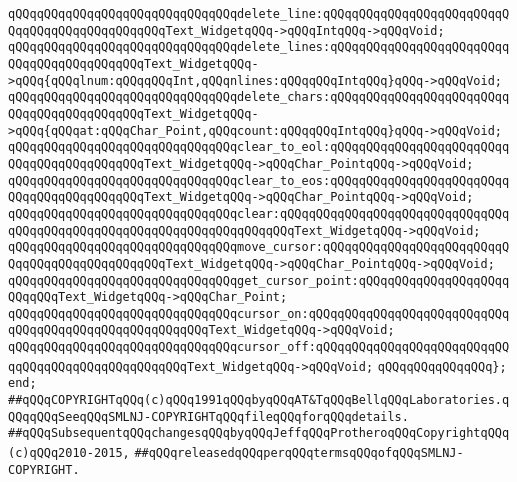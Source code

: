 \verb|qQQqqQQqqQQqqQQqqQQqqQQqqQQqqQQqdelete_line:qQQqqQQqqQQqqQQqqQQqqQQqqQQqqQQqqQQqqQQqqQQqqQQqText_WidgetqQQq->qQQqIntqQQq->qQQqVoid;|\newline
\verb|qQQqqQQqqQQqqQQqqQQqqQQqqQQqqQQqdelete_lines:qQQqqQQqqQQqqQQqqQQqqQQqqQQqqQQqqQQqqQQqqQQqText_WidgetqQQq->qQQq{qQQqlnum:qQQqqQQqInt,qQQqnlines:qQQqqQQqIntqQQq}qQQq->qQQqVoid;|\newline
\verb|qQQqqQQqqQQqqQQqqQQqqQQqqQQqqQQqdelete_chars:qQQqqQQqqQQqqQQqqQQqqQQqqQQqqQQqqQQqqQQqqQQqText_WidgetqQQq->qQQq{qQQqat:qQQqChar_Point,qQQqcount:qQQqqQQqIntqQQq}qQQq->qQQqVoid;|\newline
\newline
\verb|qQQqqQQqqQQqqQQqqQQqqQQqqQQqqQQqclear_to_eol:qQQqqQQqqQQqqQQqqQQqqQQqqQQqqQQqqQQqqQQqqQQqText_WidgetqQQq->qQQqChar_PointqQQq->qQQqVoid;|\newline
\verb|qQQqqQQqqQQqqQQqqQQqqQQqqQQqqQQqclear_to_eos:qQQqqQQqqQQqqQQqqQQqqQQqqQQqqQQqqQQqqQQqqQQqText_WidgetqQQq->qQQqChar_PointqQQq->qQQqVoid;|\newline
\verb|qQQqqQQqqQQqqQQqqQQqqQQqqQQqqQQqclear:qQQqqQQqqQQqqQQqqQQqqQQqqQQqqQQqqQQqqQQqqQQqqQQqqQQqqQQqqQQqqQQqqQQqqQQqText_WidgetqQQq->qQQqVoid;|\newline
\newline
\verb|qQQqqQQqqQQqqQQqqQQqqQQqqQQqqQQqmove_cursor:qQQqqQQqqQQqqQQqqQQqqQQqqQQqqQQqqQQqqQQqqQQqqQQqText_WidgetqQQq->qQQqChar_PointqQQq->qQQqVoid;|\newline
\verb|qQQqqQQqqQQqqQQqqQQqqQQqqQQqqQQqget_cursor_point:qQQqqQQqqQQqqQQqqQQqqQQqqQQqText_WidgetqQQq->qQQqChar_Point;|\newline
\verb|qQQqqQQqqQQqqQQqqQQqqQQqqQQqqQQqcursor_on:qQQqqQQqqQQqqQQqqQQqqQQqqQQqqQQqqQQqqQQqqQQqqQQqqQQqqQQqText_WidgetqQQq->qQQqVoid;|\newline
\verb|qQQqqQQqqQQqqQQqqQQqqQQqqQQqqQQqcursor_off:qQQqqQQqqQQqqQQqqQQqqQQqqQQqqQQqqQQqqQQqqQQqqQQqqQQqText_WidgetqQQq->qQQqVoid;|\newline
\newline
\verb|qQQqqQQqqQQqqQQq};|\newline
\newline
\verb|end;|\newline
\newline
\newline
\verb|##qQQqCOPYRIGHTqQQq(c)qQQq1991qQQqbyqQQqAT&TqQQqBellqQQqLaboratories.qQQqqQQqSeeqQQqSMLNJ-COPYRIGHTqQQqfileqQQqforqQQqdetails.|\newline
\verb|##qQQqSubsequentqQQqchangesqQQqbyqQQqJeffqQQqProtheroqQQqCopyrightqQQq(c)qQQq2010-2015,|\newline
\verb|##qQQqreleasedqQQqperqQQqtermsqQQqofqQQqSMLNJ-COPYRIGHT.|\newline

